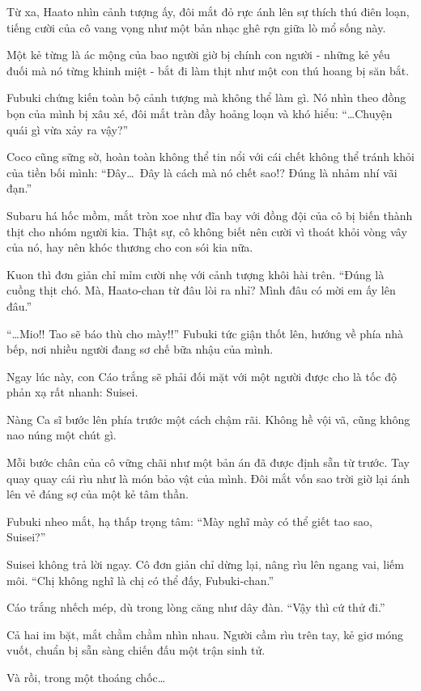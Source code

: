 \documentclass[../main.tex]{subfiles}
\begin{document}
Từ xa, Haato nhìn cảnh tượng ấy, đôi mắt đỏ rực ánh lên sự thích thú điên loạn, tiếng cười của cô vang vọng như một bản nhạc ghê rợn giữa lò mổ sống này.

Một kẻ từng là ác mộng của bao người giờ bị chính con người - những kẻ yếu đuối mà nó từng khinh miệt - bắt đi làm thịt như một con thú hoang bị săn bắt.

Fubuki chứng kiến toàn bộ cảnh tượng mà không thể làm gì. Nó nhìn theo đồng bọn của mình bị xâu xé, đôi mắt tràn đầy hoảng loạn và khó hiểu: ``\dots Chuyện quái gì vừa xảy ra vậy?''

Coco cũng sững sờ, hoàn toàn không thể tin nổi với cái chết không thể tránh khỏi của tiền bối mình: ``Đây\dots\ Đây là cách mà nó chết sao!? Đúng là nhảm nhí vãi đạn.''

Subaru há hốc mồm, mắt tròn xoe như đĩa bay với đồng đội của cô bị biến thành thịt cho nhóm người kia. Thật sự, cô không biết nên cười vì thoát khỏi vòng vây của nó, hay nên khóc thương cho con sói kia nữa.

Kuon thì đơn giản chỉ mỉm cười nhẹ với cảnh tượng khôi hài trên. ``Đúng là cuồng thịt chó. Mà, Haato-chan từ đâu lòi ra nhỉ? Mình đâu có mời em ấy lên đâu.''

``\dots Mio!! Tao sẽ báo thù cho mày!!'' Fubuki tức giận thốt lên, hướng về phía nhà bếp, nơi nhiều người đang sơ chế bữa nhậu của mình.

Ngay lúc này, con Cáo trắng sẽ phải đối mặt với một người được cho là tốc độ phản xạ rất nhanh: Suisei.

Nàng Ca sĩ bước lên phía trước một cách chậm rãi. Không hề vội vã, cũng không nao núng một chút gì.

Mỗi bước chân của cô vững chãi như một bản án đã được định sẵn từ trước. Tay quay quay cái rìu như là món bảo vật của mình. Đôi mắt vốn sao trời giờ lại ánh lên vẻ đáng sợ của một kẻ tâm thần.

Fubuki nheo mắt, hạ thấp trọng tâm: ``Mày nghĩ mày có thể giết tao sao, Suisei?''

Suisei không trả lời ngay. Cô đơn giản chỉ dừng lại, nâng rìu lên ngang vai, liếm môi. ``Chị không nghĩ là chị có thể đấy, Fubuki-chan.''

Cáo trắng nhếch mép, dù trong lòng căng như dây đàn. ``Vậy thì cứ thử đi.''

Cả hai im bặt, mắt chằm chằm nhìn nhau. Người cầm rìu trên tay, kẻ giơ móng vuốt, chuẩn bị sẵn sàng chiến đấu một trận sinh tử.

Và rồi, trong một thoáng chốc\dots
\end{document}
